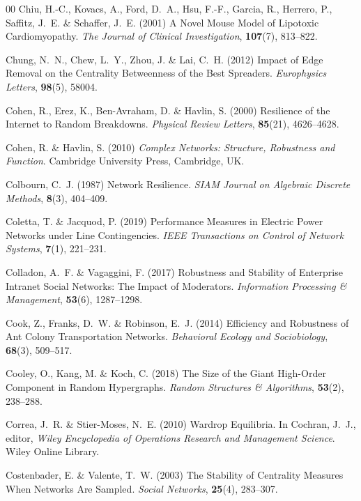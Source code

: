 \documentclass{comnet-mod}
\begin{document}
\begin{thebibliography}{00}
Chiu, H.-C., Kovacs, A., Ford, D.~A., Hsu, F.-F., Garcia, R., Herrero, P.,
  Saffitz, J.~E. {\&} Schaffer, J.~E. (2001)  {A Novel Mouse Model of Lipotoxic
  Cardiomyopathy}. {\em {The Journal of Clinical Investigation}},
  \textbf{107}(7), 813--822.

Chung, N.~N., Chew, L.~Y., Zhou, J. {\&} Lai, C.~H. (2012)  {Impact of Edge
  Removal on the Centrality Betweenness of the Best Spreaders}. {\em
  {Europhysics Letters}}, \textbf{98}(5), 58004.

Cohen, R., Erez, K., {Ben-Avraham}, D. {\&} Havlin, S. (2000)  {Resilience of
  the Internet to Random Breakdowns}. {\em {Physical Review Letters}},
  \textbf{85}(21), 4626--4628.

Cohen, R. {\&} Havlin, S. (2010) {\em {Complex Networks: {{Structure}},
  Robustness and Function}}.
{Cambridge University Press}, {Cambridge, UK}.

Colbourn, C.~J. (1987)  {Network Resilience}. {\em {SIAM Journal on Algebraic
  Discrete Methods}}, \textbf{8}(3), 404--409.

Coletta, T. {\&} Jacquod, P. (2019)  {Performance Measures in Electric Power
  Networks under Line Contingencies}. {\em {IEEE Transactions on Control of
  Network Systems}}, \textbf{7}(1), 221--231.

Colladon, A.~F. {\&} Vagaggini, F. (2017)  {Robustness and Stability of
  Enterprise Intranet Social Networks: {{The}} Impact of Moderators}. {\em
  {Information Processing \& Management}}, \textbf{53}(6), 1287--1298.

Cook, Z., Franks, D.~W. {\&} Robinson, E.~J. (2014)  {Efficiency and Robustness
  of Ant Colony Transportation Networks}. {\em {Behavioral Ecology and
  Sociobiology}}, \textbf{68}(3), 509--517.

Cooley, O., Kang, M. {\&} Koch, C. (2018)  {The Size of the Giant High-Order
  Component in Random Hypergraphs}. {\em {Random Structures \& Algorithms}},
  \textbf{53}(2), 238--288.

Correa, J.~R. {\&} {Stier-Moses}, N.~E. (2010)  {Wardrop Equilibria}. In
  Cochran, J.~J., editor, {\em {Wiley Encyclopedia of Operations Research and
  Management Science}}. {Wiley Online Library}.

Costenbader, E. {\&} Valente, T.~W. (2003)  {The Stability of Centrality
  Measures When Networks Are Sampled}. {\em {Social Networks}}, \textbf{25}(4),
  283--307.


\end{thebibliography}
\end{document}
